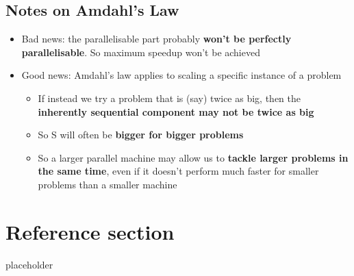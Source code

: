 \documentclass{article}
\begin{document}
\subsection{Notes on Amdahl’s Law}
\begin{itemize}
  \item Bad news: the parallelisable part probably \textbf{won’t be perfectly parallelisable}. So maximum speedup won’t be achieved
  \item Good news: Amdahl’s law applies to scaling a specific instance of a problem
  \begin{itemize}
    \item If instead we try a problem that is (say) twice as big, then the \textbf{inherently sequential component may not be twice as big}
    \item So S will often be \textbf{bigger for bigger problems}
    \item So a larger parallel machine may allow us to \textbf{tackle larger problems in the same time}, even if it doesn’t perform much faster for smaller problems than a smaller machine
  \end{itemize}
\end{itemize}

\pagebreak
\section*{Reference section} \label{sec:reference}
\begin{description}
	\item[placeholder] \hfill \\
\end{description}
\end{document}
